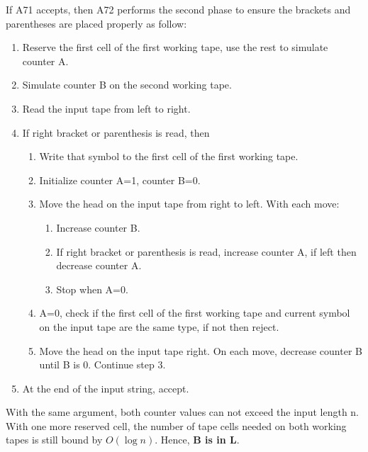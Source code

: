 \documentclass{article}
\begin{document}
If A71 accepts, then A72 performs the second phase to ensure the brackets and parentheses are placed properly as follow:
\begin{enumerate}
    \item Reserve the first cell of the first working tape, use the rest to simulate counter A.
    \item Simulate counter B on the second working tape.
    \item Read the input tape from left to right.
    \item If right bracket or parenthesis is read, then
    \begin{enumerate}
        \item Write that symbol to the first cell of the first working tape.
        \item Initialize counter A=1, counter B=0.
        \item Move the head on the input tape from right to left. With each move: 
            \begin{enumerate}
                \item Increase counter B.
                \item If right bracket or parenthesis is read, increase counter A, if left then decrease counter A.
                \item Stop when A=0.
            \end{enumerate}
        \item A=0, check if the first cell of the first working tape and current symbol on the input tape are the same type, if not then reject.
        \item Move the head on the input tape right. On each move, decrease counter B until B is 0. Continue step 3.
    \end{enumerate}
    \item At the end of the input string, accept.
\end{enumerate}

With the same argument, both counter values can not exceed the input length n. With one more reserved cell, the number of tape cells needed on both working tapes is still bound by $O(\log n)$. Hence, \textbf{B is in L}.
\end{document}

